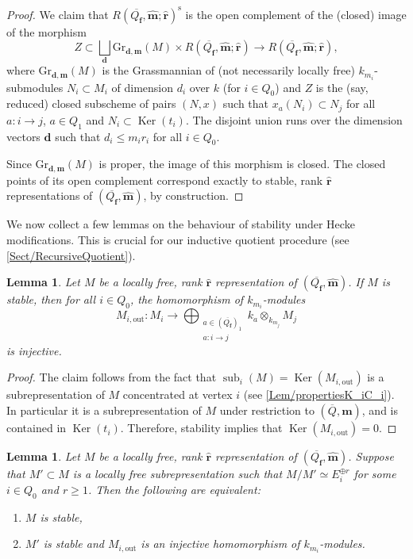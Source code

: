 \documentclass[a4paper,12pt]{article}
\theoremstyle{definition}
\theoremstyle{plain}
\newtheorem{lemma}[definition]{Lemma}
\theoremstyle{remark}
\DeclareMathOperator{\Ker}{Ker}
\DeclareMathOperator{\sub}{sub}
\newcommand{\st}{\mathrm{s}}
\newcommand\bfd{\mathbf{d}}
\newcommand\bff{\mathbf{f}}
\newcommand\bfm{\mathbf{m}}
\newcommand\bfr{\mathbf{r}}
\begin{document}
\begin{proof}
We claim that $R(\overline{Q_\bff},\widehat{\bfm};\widehat{\bfr})^{\st}$ is the open complement of the (closed) image of the morphism
\[
Z\subset
\bigsqcup_\bfd\mathrm{Gr}_{\bfd,\bfm}(M)\times R(\overline{Q_\bff},\widehat{\bfm};\widehat{\bfr})
\rightarrow
R(\overline{Q_\bff},\widehat{\bfm};\widehat{\bfr}),
\]
where $\mathrm{Gr}_{\bfd,\bfm}(M)$ is the Grassmannian of (not necessarily locally free) $k_{m_i}$-submodules $N_i\subset M_i$ of dimension $d_i$ over $k$ (for $i\in Q_0$) and $Z$ is the (say, reduced) closed subscheme of pairs $(N,x)$ such that $x_a(N_i)\subset N_j$ for all $a:i\rightarrow j$, $a\in Q_1$ and $N_i\subset\Ker(t_i)$. The disjoint union runs over the dimension vectors $\bfd$ such that $d_i\leq m_ir_i$ for all $i\in Q_0$.

Since $\mathrm{Gr}_{\bfd,\bfm}(M)$ is proper, the image of this morphism is closed. The closed points of its open complement correspond exactly to stable, rank $\widehat{\bfr}$ representations of $(\overline{Q_\bff},\widehat{\bfm})$, by construction.
\end{proof}

We now collect a few lemmas on the behaviour of stability under Hecke modifications. This is crucial for our inductive quotient procedure (see \cref{Sect/RecursiveQuotient}).

\begin{lemma}\label{Lem/stabilityCriterion}
Let $M$ be a locally free, rank $\widehat{\bfr}$ representation of $(\overline{Q_\bff},\widehat{\bfm})$. If $M$ is stable, then for all $i\in Q_0$, the homomorphism of $k_{m_i}$-modules
\[
M_{i,\mathrm{out}} \colon M_i\rightarrow\bigoplus_{\substack{a\in (\overline{Q_\bff})_1 \\ a \colon i\rightarrow j}}k_a\otimes_{k_{m_j}}M_j
\]
is injective.
\end{lemma}

\begin{proof}
The claim follows from the fact that $\sub_i(M)=\Ker(M_{i,\mathrm{out}})$ is a subrepresentation of $M$ concentrated at vertex $i$ (see \cref{Lem/propertiesK_iC_i}). In particular it is a subrepresentation of $M$ under restriction to $(\overline{Q},\bfm)$, and is contained in $\Ker(t_i)$. Therefore, stability implies that $\Ker(M_{i,\mathrm{out}})=0$. \end{proof}

\begin{lemma}\label{Lem/stabilityHeckeModification}
Let $M$ be a locally free, rank $\widehat{\bfr}$ representation of $(\overline{Q_\bff},\widehat{\bfm})$. Suppose that $M'\subset M$ is a locally free subrepresentation such that $M/M'\simeq E_i^{\oplus r}$ for some $i\in Q_0$ and $r\geq1$. Then the following are equivalent:
\begin{enumerate}[label=\emph{\roman*})]
\item $M$ is stable,
\item $M'$ is stable and $M_{i,\mathrm{out}}$ is an injective homomorphism of $k_{m_i}$-modules.
\end{enumerate}
\end{lemma}
\end{document}
